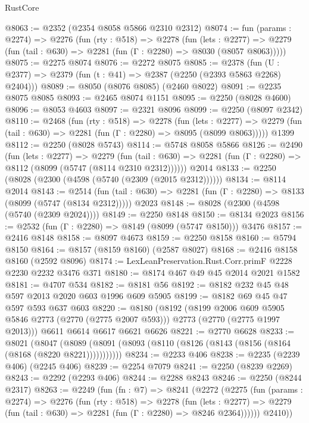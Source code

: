 \begin{lexlean}{RustCore}
\begin{coremodule}
@8063 := @2352 (@2354 @8058 @5866 @2310 @2312)
@8074 := fun (params : @2274) =>
  @2276
    (fun (rty : @518) =>
    @2278
      (fun (lets : @2277) =>
      @2279 (fun (tail : @630) => @2281 (fun (Γ : @2280) => @8030 (@8057 @8063)))))
@8075 := @2275 @8074
@8076 := @2272 @8075
@8085 := @2378 (fun (U : @2377) => @2379 (fun (t : @41) => @2387 (@2250 (@2393 @5863 @2268) @2404)))
@8089 := @8050 (@8076 @8085) (@2460 @8022)
@8091 := @2235 @8075 @8085
@8093 := @2465 @8074 @1151
@8095 := @2250 (@8028 @4600)
@8096 := @8053 @4603
@8097 := @2321 @8096
@8099 := @2250 (@8097 @2342)
@8110 := @2468
    (fun (rty : @518) =>
    @2278
      (fun (lets : @2277) =>
      @2279 (fun (tail : @630) => @2281 (fun (Γ : @2280) => @8095 (@8099 @8063)))))
    @1399
@8112 := @2250 (@8028 @5743)
@8114 := @5748 @8058 @5866
@8126 := @2490
    (fun (lets : @2277) =>
    @2279
      (fun (tail : @630) => @2281 (fun (Γ : @2280) => @8112 (@8099 (@5747 (@8114 @2310 @2312))))))
    @2014
@8133 := @2250 (@8028 (@2300 (@4598 (@5740 (@2309 (@2015 @2312))))))
@8134 := @8114 @2014
@8143 := @2514
    (fun (tail : @630) => @2281 (fun (Γ : @2280) => @8133 (@8099 (@5747 (@8134 @2312)))))
    @2023
@8148 := @8028 (@2300 (@4598 (@5740 (@2309 @2024))))
@8149 := @2250 @8148
@8150 := @8134 @2023
@8156 := @2532 (fun (Γ : @2280) => @8149 (@8099 (@5747 @8150))) @3476
@8157 := @2416 @8148
@8158 := @8097 @4673
@8159 := @2250 @8158
@8160 := @5794 @8150
@8164 := @8157 (@8159 @8160) (@2587 @8027)
@8168 := @2416 @8158 @8160 (@2592 @8096)
@8174 := LexLeanPreservation.Rust.Corr.primF @2228 @2230 @2232 @3476 @371
@8180 := @8174 @467 @49 @45 @2014 @2021 @1582
@8181 := @4707 @534
@8182 := @8181 @56
@8192 := @8182 @232 @45 @48 @597 @2013 @2020 @603 @1996 @609 @5905
@8199 := @8182 @69 @45 @47 @597 @593 @637 @603
@8220 := @8180
    (@8192
      (@8199 @2006 @609 @5905 @5846 @2773 (@2770 (@2775 @2007 @593)))
      @2773
      (@2770 (@2775 @1997 @2013)))
    @6611
    @6614
    @6617
    @6621
    @6626
@8221 := @2770 @6628
@8233 := @8021
    (@8047 (@8089 (@8091 (@8093 (@8110 (@8126 (@8143 (@8156 (@8164 (@8168 (@8220 @8221)))))))))))
@8234 := @2233 @406
@8238 := @2235 (@2239 @406) (@2245 @406)
@8239 := @2254 @7079
@8241 := @2250 (@8239 @2269)
@8243 := @2292 (@2293 @406)
@8244 := @2288 @8243
@8246 := @2250 (@8244 @2317)
@8263 := @2249
    (fun (fn : @7) =>
    @8241
      (@2272
        (@2275
          (fun (params : @2274) =>
          @2276
            (fun (rty : @518) =>
            @2278
              (fun (lets : @2277) =>
              @2279 (fun (tail : @630) => @2281 (fun (Γ : @2280) => @8246 @2364))))))
        @2410))

\end{coremodule}
\end{lexlean}
